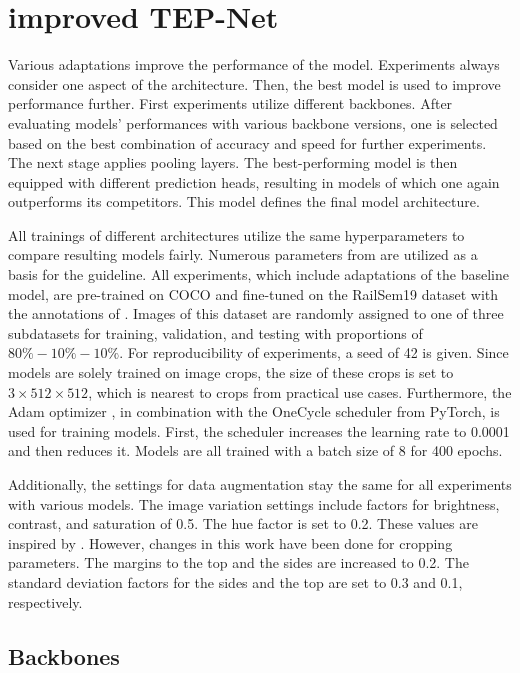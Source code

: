 \section{improved TEP-Net}

Various adaptations improve the performance of the model.
Experiments always consider one aspect of the architecture.
Then, the best model is used to improve performance further.
First experiments utilize different backbones.
After evaluating models' performances with various backbone versions, one is selected based on the best combination of accuracy and speed for further experiments.
The next stage applies pooling layers.
The best-performing model is then equipped with different prediction heads, resulting in models of which one again outperforms its competitors.
This model defines the final model architecture.

All trainings of different architectures utilize the same hyperparameters to compare resulting models fairly.
Numerous parameters from \cite{tepNet2024} are utilized as a basis for the guideline.
All experiments, which include adaptations of the baseline model, are pre-trained on COCO and fine-tuned on the RailSem19 dataset with the annotations of \cite{tepNet2024}.
Images of this dataset are randomly assigned to one of three subdatasets for training, validation, and testing with proportions of $80\%-10\%-10\%$.
For reproducibility of experiments, a seed of 42 is given.
Since models are solely trained on image crops, the size of these crops is set to $3 \times 512 \times 512$, which is nearest to crops from practical use cases.
Furthermore, the Adam optimizer \cite{pytorchAdamOptimizer}, in combination with the OneCycle scheduler \cite{pytorch_oneCycleLR_docu} from PyTorch, is used for training models.
First, the scheduler increases the learning rate to 0.0001 and then reduces it.
Models are all trained with a batch size of 8 for 400 epochs.

Additionally, the settings for data augmentation stay the same for all experiments with various models.
The image variation settings include factors for brightness, contrast, and saturation of 0.5.
The hue factor is set to 0.2.
These values are inspired by \cite{tepNet2024}.
However, changes in this work have been done for cropping parameters.
The margins to the top and the sides are increased to 0.2.
The standard deviation factors for the sides and the top are set to 0.3 and 0.1, respectively.

\subsection{Backbones}

